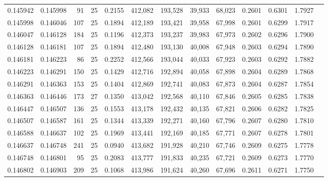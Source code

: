 \begin{tabular}{rrrrrrrrrrrrr}
0.145942 & 0.145998 &    91 &  25 &                                     0.2155 & 412,082 & 193,528 &  39,933 &  68,023 & 0.2601 & 0.6301 & 1.7927 \\
0.145998 & 0.146046 &   107 &  25 &                                     0.1894 & 412,189 & 193,421 &  39,958 &  67,998 & 0.2601 & 0.6299 & 1.7917 \\
0.146047 & 0.146128 &   184 &  25 &                                     0.1196 & 412,373 & 193,237 &  39,983 &  67,973 & 0.2602 & 0.6296 & 1.7900 \\
0.146128 & 0.146181 &   107 &  25 &                                     0.1894 & 412,480 & 193,130 &  40,008 &  67,948 & 0.2603 & 0.6294 & 1.7890 \\
0.146181 & 0.146223 &    86 &  25 &                                     0.2252 & 412,566 & 193,044 &  40,033 &  67,923 & 0.2603 & 0.6292 & 1.7882 \\
0.146223 & 0.146291 &   150 &  25 &                                     0.1429 & 412,716 & 192,894 &  40,058 &  67,898 & 0.2604 & 0.6289 & 1.7868 \\
0.146291 & 0.146363 &   153 &  25 &                                     0.1404 & 412,869 & 192,741 &  40,083 &  67,873 & 0.2604 & 0.6287 & 1.7854 \\
0.146363 & 0.146446 &   173 &  27 &                                     0.1350 & 413,042 & 192,568 &  40,110 &  67,846 & 0.2605 & 0.6285 & 1.7838 \\
0.146447 & 0.146507 &   136 &  25 &                                     0.1553 & 413,178 & 192,432 &  40,135 &  67,821 & 0.2606 & 0.6282 & 1.7825 \\
0.146507 & 0.146587 &   161 &  25 &                                     0.1344 & 413,339 & 192,271 &  40,160 &  67,796 & 0.2607 & 0.6280 & 1.7810 \\
0.146588 & 0.146637 &   102 &  25 &                                     0.1969 & 413,441 & 192,169 &  40,185 &  67,771 & 0.2607 & 0.6278 & 1.7801 \\
0.146637 & 0.146748 &   241 &  25 &                                     0.0940 & 413,682 & 191,928 &  40,210 &  67,746 & 0.2609 & 0.6275 & 1.7778 \\
0.146748 & 0.146801 &    95 &  25 &                                     0.2083 & 413,777 & 191,833 &  40,235 &  67,721 & 0.2609 & 0.6273 & 1.7770 \\
0.146802 & 0.146903 &   209 &  25 &                                     0.1068 & 413,986 & 191,624 &  40,260 &  67,696 & 0.2611 & 0.6271 & 1.7750 \\

\end{tabular}
